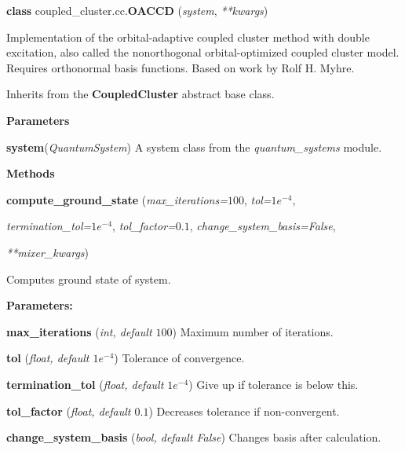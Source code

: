 \begin{tcolorbox}
    {\selectfont
    \textbf{class} coupled\_cluster.cc.\textbf{OACCD}
    (\emph{system}, \emph{**kwargs})

    \vspace{1em}
    Implementation of the orbital-adaptive coupled cluster method with double excitation,
    also called the nonorthogonal orbital-optimized coupled cluster model.
    Requires orthonormal basis functions. Based on work by Rolf H. 
    Myhre\cite{myhre2018demonstrating}.

    Inherits from the \textbf{CoupledCluster} abstract base class.

    \vspace{1em}
    \textbf{Parameters}

    \hspace{2em}\textbf{system}(\emph{QuantumSystem}) A system class from the 
        \emph{quantum\_systems} module.

    \vspace{1em} 
    \textbf{Methods}

    \hspace{2em} \textbf{compute\_ground\_state}
        (\emph{max\_iterations=$100$}, \emph{tol=$1e^{-4}$},

        \hspace{3em} \emph{termination\_tol=$1e^{-4}$}, \emph{tol\_factor=$0.1$},
        \emph{change\_system\_basis=False},
        
        \hspace{3.2em}\emph{**mixer\_kwargs})

        \begin{adjustwidth}{4em}{}
        Computes ground state of system.

        \textbf{Parameters:} 

            \hspace{1.5em}\textbf{max\_iterations} (\emph{int, default $100$}) 
            Maximum number of iterations.

            \hspace{1.5em}\textbf{tol} (\emph{float, default $1e^{-4}$})
            Tolerance of convergence.

            \hspace{1.5em}\textbf{termination\_tol} (\emph{float, default $1e^{-4}$})
            Give up if tolerance is below this.

            \hspace{1.5em}\textbf{tol\_factor} (\emph{float, default $0.1$})
            Decreases tolerance if non-convergent.

            \hspace{1.5em}\textbf{change\_system\_basis} (\emph{bool, default False})
            Changes basis after calculation.

        \end{adjustwidth}
    } 
\end{tcolorbox}
